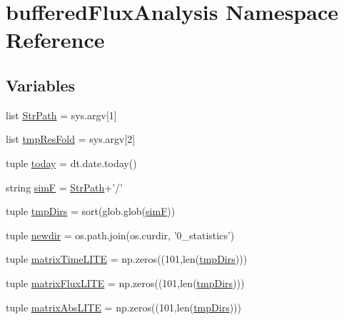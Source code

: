 \hypertarget{namespacebuffered_flux_analysis}{\section{buffered\-Flux\-Analysis Namespace Reference}
\label{namespacebuffered_flux_analysis}
}
\subsection*{Variables}
\begin{DoxyCompactItemize}
\item 
list \hyperlink{namespacebuffered_flux_analysis_a86b649a1e51f1e3384ad432c0de3340b}{Str\-Path} = sys.\-argv\mbox{[}1\mbox{]}
\item 
list \hyperlink{namespacebuffered_flux_analysis_a3293821a23ed904d4f68dffd94c609e1}{tmp\-Res\-Fold} = sys.\-argv\mbox{[}2\mbox{]}
\item 
tuple \hyperlink{namespacebuffered_flux_analysis_a37cf8287ac5d9f5b83732efe352cf154}{today} = dt.\-date.\-today()
\item 
string \hyperlink{namespacebuffered_flux_analysis_a94f9529239340003572ace8de46bee35}{sim\-F} = \hyperlink{namespacebuffered_flux_analysis_a86b649a1e51f1e3384ad432c0de3340b}{Str\-Path}+'/'
\item 
tuple \hyperlink{namespacebuffered_flux_analysis_afaa1b171179d99fee6ead2ae14dc8fc6}{tmp\-Dirs} = sort(glob.\-glob(\hyperlink{namespacebuffered_flux_analysis_a94f9529239340003572ace8de46bee35}{sim\-F}))
\item 
tuple \hyperlink{namespacebuffered_flux_analysis_a90d7a1a691a7ba3f095a06b940e152c9}{newdir} = os.\-path.\-join(os.\-curdir, '0\-\_\-statistics')
\item 
tuple \hyperlink{namespacebuffered_flux_analysis_a620ce4d1c541ead7668e3872c011a35c}{matrix\-Time\-L\-I\-T\-E} = np.\-zeros((101,len(\hyperlink{namespacebuffered_flux_analysis_afaa1b171179d99fee6ead2ae14dc8fc6}{tmp\-Dirs})))
\item 
tuple \hyperlink{namespacebuffered_flux_analysis_a160e0d0c0c7cff8f8a141429c1235eb8}{matrix\-Flux\-L\-I\-T\-E} = np.\-zeros((101,len(\hyperlink{namespacebuffered_flux_analysis_afaa1b171179d99fee6ead2ae14dc8fc6}{tmp\-Dirs})))
\item 
tuple \hyperlink{namespacebuffered_flux_analysis_a1f521f6f720583fe2e06f9a3127841fb}{matrix\-Abs\-L\-I\-T\-E} = np.\-zeros((101,len(\hyperlink{namespacebuffered_flux_analysis_afaa1b171179d99fee6ead2ae14dc8fc6}{tmp\-Dirs})))

\end{DoxyCompactItemize}
